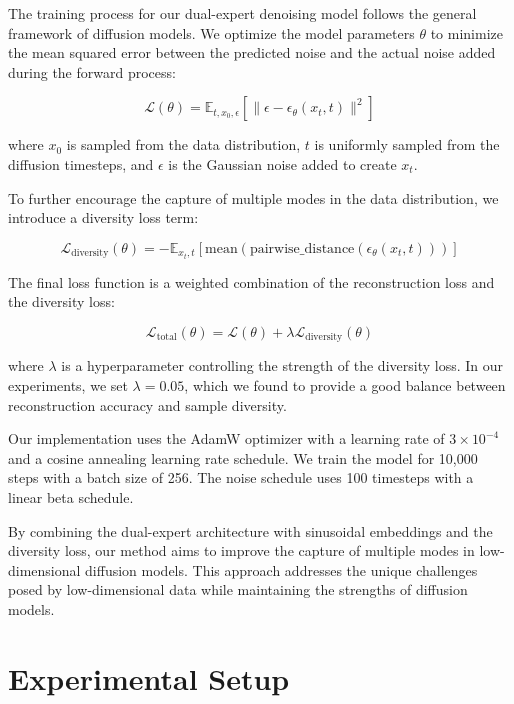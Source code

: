 \documentclass{article} %
\begin{document}
The training process for our dual-expert denoising model follows the general framework of diffusion models. We optimize the model parameters $\theta$ to minimize the mean squared error between the predicted noise and the actual noise added during the forward process:

\begin{equation}
    \mathcal{L}(\theta) = \mathbb{E}_{t, x_0, \epsilon}[\|\epsilon - \epsilon_\theta(x_t, t)\|^2]
\end{equation}

where $x_0$ is sampled from the data distribution, $t$ is uniformly sampled from the diffusion timesteps, and $\epsilon$ is the Gaussian noise added to create $x_t$.

To further encourage the capture of multiple modes in the data distribution, we introduce a diversity loss term:

\begin{equation}
    \mathcal{L}_\text{diversity}(\theta) = -\mathbb{E}_{x_t, t}[\text{mean}(\text{pairwise\_distance}(\epsilon_\theta(x_t, t)))]
\end{equation}

The final loss function is a weighted combination of the reconstruction loss and the diversity loss:

\begin{equation}
    \mathcal{L}_\text{total}(\theta) = \mathcal{L}(\theta) + \lambda \mathcal{L}_\text{diversity}(\theta)
\end{equation}

where $\lambda$ is a hyperparameter controlling the strength of the diversity loss. In our experiments, we set $\lambda = 0.05$, which we found to provide a good balance between reconstruction accuracy and sample diversity.

Our implementation uses the AdamW optimizer with a learning rate of $3 \times 10^{-4}$ and a cosine annealing learning rate schedule. We train the model for 10,000 steps with a batch size of 256. The noise schedule uses 100 timesteps with a linear beta schedule.

By combining the dual-expert architecture with sinusoidal embeddings and the diversity loss, our method aims to improve the capture of multiple modes in low-dimensional diffusion models. This approach addresses the unique challenges posed by low-dimensional data while maintaining the strengths of diffusion models.

\section{Experimental Setup}
\label{sec:experimental}
\end{document}
